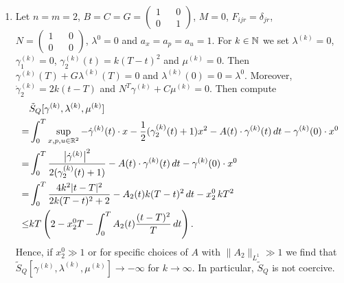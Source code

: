 \documentclass[11pt]{article}
\begin{document}
\begin{remark}
\begin{enumerate}
\item  Let $n=m=2$, $B=C=G= \begin{pmatrix} 1&& 0 \\ 0 && 1 \end{pmatrix}$, $M=0$, $F_{ijr} = \delta_{jr}$, $N = \begin{pmatrix} 1 && 0 \\ 0 && 0\end{pmatrix}$, $\lambda^0 = 0$ and $a_x=a_p=a_u=1$. 
 For $k \in \mathbb N$ we set $\lambda^{(k)} = 0$, $\gamma^{(k)}_1 = 0$, $\gamma^{(k)}_2(t) = k( T-t)^2$ and $\mu^{(k)} = 0$.
    Then $\gamma^{(k)}(T) + G \lambda^{(k)}(T) = 0$ and $\lambda^{(k)}(0) = 0 = \lambda^0$. 
    Moreover, $\dot{\gamma}^{(k)}_2 = 2 k (t-T)$ and $N^T\gamma^{(k)} + C \mu^{(k)} = 0$.
    Then compute 
    \begin{align*}
&\tilde{S}_Q[\gamma^{(k)},\lambda^{(k)},\mu^{(k)}] \\ 
= & \int_0^T \sup_{x,p,u\in \mathbb R^2} - \dot{\gamma}^{(k)}(t) \cdot x -\frac12(\gamma^{(k)}_2(t) + 1) x^2  - A(t)\cdot \gamma^{(k)}(t) \, dt - \gamma^{(k)}(0)\cdot x^0 \\
= &\int_0^T \frac{\left| \dot{\gamma}^{(k)}  \right|^2}{2(\gamma^{(k)}_2(t) + 1)}  - A(t) \cdot \gamma^{(k)}(t) \, dt - \gamma^{(k)}(0)\cdot x^0 \\
=& \int_0^T \frac{4k^2 |t-T|^2}{2 k (T-t)^2 + 2}  - A_2(t) k (T-t)^2 \, dt - x^0_2 \, k T^2 \\
\leq& kT \left(2 - x^0_2T -  \int_0^T A_2(t) \frac{(t-T)^2}T \, dt\right).
    \end{align*}
Hence, if $x^0_2 \gg 1$ or for specific choices of $A$ with $\|A_2\|_{L^1} \gg 1$ we find that $\tilde{S}_Q[\gamma^{(k)},\lambda^{(k)},\mu^{(k)}] \to -\infty$ for $k\to \infty$. In particular, $\tilde{S}_Q$ is not coercive.


\end{enumerate}
\end{remark}
\end{document}

